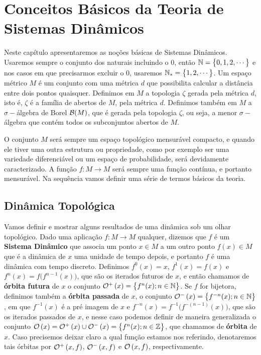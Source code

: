 %

\chapter{Conceitos Básicos da Teoria de Sistemas Dinâmicos} 

Neste capítulo apresentaremos as noções básicas de Sistemas Dinâmicos. Usaremos sempre o conjunto dos naturais incluindo o $0$, então $\mathbb{N}=\big\{0,1,2,\cdots\big\}$ e nos casos em que precisarmos excluir o $0$, usaremos $\mathbb{N}_{*}=\big\{1,2,\cdots\big\}$. Um espaço métrico $M$ é um conjunto com uma métrica $d$ que possibilita calcular a distância entre dois pontos quaisquer. Definimos em $M$ a topologia $\zeta$ gerada pela métrica $d$, isto é, $\zeta$ é a família de abertos de $M$, pela métrica $d$. Definimos também em $M$ a $\sigma-$álgebra de Borel $\mathcal{B}(M)$, que é gerada pela topologia $\zeta$, ou seja, a menor $\sigma-$álgebra que contém todos os subconjuntos abertos de $M$. 

O conjunto $M$ será sempre um espaço topológico mensurável compacto, e quando ele tiver uma outra estrutura ou propriedade, como por exemplo ser uma variedade diferenciável ou um espaço de probabilidade, será devidamente caracterizado. A função $f:M\to M$ será sempre uma função contínua, e portanto mensurável. Na sequência vamos definir uma série de termos básicos da teoria.

\section{Dinâmica Topológica}

Vamos definir e mostrar alguns resultados de uma dinâmica sob um olhar topológico. Dado uma aplicação $f:M\to M$ qualquer, dizemos que $f$ é um \textbf{Sistema Dinâmico} que associa um ponto $x\in M$ a um outro ponto $f(x)\in M$ que é a dinâmica de $x$ uma unidade de tempo depois, e portanto $f$ é uma dinâmica com tempo discreto. Definimos $f^{0}(x)=x$, $f^1(x)=f(x)$ e $f^{n}(x)=f\big(f^{n-1}(x)\big)$, que são os iterados futuros de $x$, e então chamamos de \textbf{órbita futura} de $x$ o conjunto $\mathcal{O}^{+}\left(x\right)=\big\{f^n(x);n\in\mathbb{N}\big\}$. Se $f$ for bijetora, definimos também a \textbf{órbita passada} de $x$, o conjunto $\mathcal{O}^{-}\left(x\right)=\big\{f^{-n}(x);n\in\mathbb{N}\big\}$, em que $f^{-1}(x)$ é a pré imagem de $x$ e $f^{-n}(x)=f^{-1}\big(f^{-(n-1)}(x)\big)$, que são os iterados passados de $x$, e nesse caso podemos definir de maneira generalizada o conjunto $\mathcal{O}\left(x\right)=\mathcal{O}^{+}\left(x\right)\cup\mathcal{O}^{-}\left(x\right)=\big\{f^{n}(x);n\in\mathbb{Z}\big\}$, que chamamos de \textbf{órbita} de $x$. Caso precisemos deixar claro a qual função estamos nos referindo, denotaremos tais órbitas por $\mathcal{O}^{+}\left(x,f\right)$, $\mathcal{O}^{-}\left(x,f\right)$ e $\mathcal{O}\left(x,f\right)$, respectivamente.

